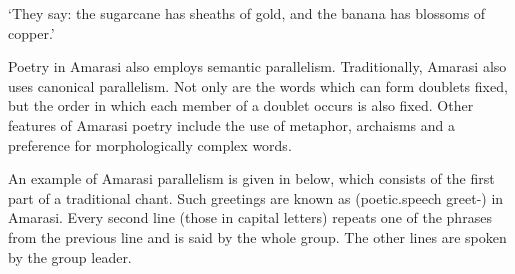 \begin{exe}
\begin{xlist}
{		\glt	`They say: the sugarcane has sheaths of gold, and the banana has blossoms of copper.'\vspace{11pt}}
	\end{xlist}
\end{exe}

Poetry in Amarasi also employs semantic parallelism.
Traditionally, Amarasi also uses canonical parallelism.
Not only are the words which can form doublets fixed,
but the order in which each member of a doublet occurs is also fixed.
Other features of Amarasi poetry include the use of metaphor, archaisms
and a preference for morphologically complex words.

An example of Amarasi parallelism is given in 
below, which consists of the first part of a traditional chant.
Such greetings are known as  (poetic.speech greet-{\at}) in Amarasi.
Every second line (those in capital letters) repeats one
of the phrases from the previous line and is said by the whole group.
The other lines are spoken by the group leader.


